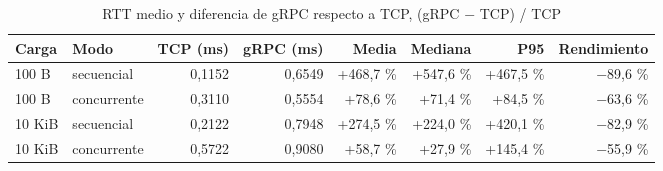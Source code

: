 \begin{table}[htbp]
\centering
\small
\caption{RTT medio y diferencia de gRPC respecto a TCP, (gRPC $-$ TCP) / TCP}
\label{tab:comparacion}
\begin{tabular}{llrrrrrr}
\hline
Carga & Modo & TCP (ms) & gRPC (ms) & Media & Mediana & P95 & Rendimiento \\
\hline
100 B & secuencial & 0,1152 & 0,6549 & +468,7 \% & +547,6 \% & +467,5 \% & $-$89,6 \% \\
100 B & concurrente & 0,3110 & 0,5554 & +78,6 \% & +71,4 \% & +84,5 \% & $-$63,6 \% \\
10 KiB & secuencial & 0,2122 & 0,7948 & +274,5 \% & +224,0 \% & +420,1 \% & $-$82,9 \% \\
10 KiB & concurrente & 0,5722 & 0,9080 & +58,7 \% & +27,9 \% & +145,4 \% & $-$55,9 \% \\
\hline
\end{tabular}
\end{table}

